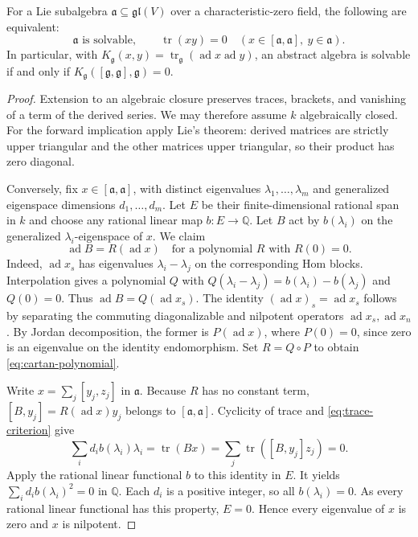 \begin{theorem}\label{res:B04}
For a Lie subalgebra \(\mathfrak a\subseteq\mathfrak{gl}(V)\)
over a characteristic-zero field, the following are equivalent:
\[
 \mathfrak a\text{ is solvable},\qquad
 \operatorname{tr}(xy)=0
 \quad(x\in[\mathfrak a,\mathfrak a],\ y\in\mathfrak a).
 \tag{2.1}\label{eq:trace-criterion}
\]
In particular, with
\(K_{\mathfrak g}(x,y)=
\operatorname{tr}_{\mathfrak g}(\operatorname{ad}x\operatorname{ad}y)\),
an abstract algebra is solvable if and only if
\(K_{\mathfrak g}([\mathfrak g,\mathfrak g],\mathfrak g)=0\).
\end{theorem}

\begin{proof}
Extension to an algebraic closure preserves traces,
brackets, and vanishing of a term of the derived series.
We may therefore assume \(k\) algebraically closed.
For the forward implication apply Lie's theorem:
derived matrices are strictly upper triangular and the
other matrices upper triangular, so their product has zero
diagonal.

Conversely, fix \(x\in[\mathfrak a,\mathfrak a]\), with
distinct eigenvalues \(\lambda_1,\ldots,\lambda_m\) and
generalized eigenspace dimensions \(d_1,\ldots,d_m\).
Let \(E\) be their finite-dimensional rational span in \(k\)
and choose any rational linear map \(b:E\to\mathbb Q\).
Let \(B\) act by \(b(\lambda_i)\) on the generalized
\(\lambda_i\)-eigenspace of \(x\). We claim
\[
 \operatorname{ad}B=R(\operatorname{ad}x)
 \quad\text{for a polynomial }R\text{ with }R(0)=0.
 \tag{2.2}\label{eq:cartan-polynomial}
\]
Indeed, \(\operatorname{ad}x_s\) has eigenvalues
\(\lambda_i-\lambda_j\) on the corresponding Hom blocks.
Interpolation gives a polynomial \(Q\) with
\(Q(\lambda_i-\lambda_j)=b(\lambda_i)-b(\lambda_j)\)
and \(Q(0)=0\). Thus
\(\operatorname{ad}B=Q(\operatorname{ad}x_s)\).
The identity
\((\operatorname{ad}x)_s=\operatorname{ad}x_s\)
follows by separating the commuting diagonalizable and
nilpotent operators
\(\operatorname{ad}x_s,\operatorname{ad}x_n\).
By Jordan decomposition, the former is \(P(\operatorname{ad}x)\),
where \(P(0)=0\), since zero is an eigenvalue on the identity
endomorphism. Set \(R=Q\circ P\) to obtain
\eqref{eq:cartan-polynomial}.

Write \(x=\sum_j[y_j,z_j]\) in \(\mathfrak a\).
Because \(R\) has no constant term,
\([B,y_j]=R(\operatorname{ad}x)y_j\) belongs to
\([\mathfrak a,\mathfrak a]\). Cyclicity of trace and
\eqref{eq:trace-criterion} give
\[
 \sum_i d_i b(\lambda_i)\lambda_i
 =\operatorname{tr}(Bx)
 =\sum_j\operatorname{tr}([B,y_j]z_j)=0.
\]
Apply the rational linear functional \(b\) to this
identity in \(E\). It yields
\(\sum_i d_i b(\lambda_i)^2=0\) in \(\mathbb Q\).
Each \(d_i\) is a positive integer, so all
\(b(\lambda_i)=0\). As every rational linear functional
has this property, \(E=0\). Hence every eigenvalue of
\(x\) is zero and \(x\) is nilpotent.


\end{proof}
